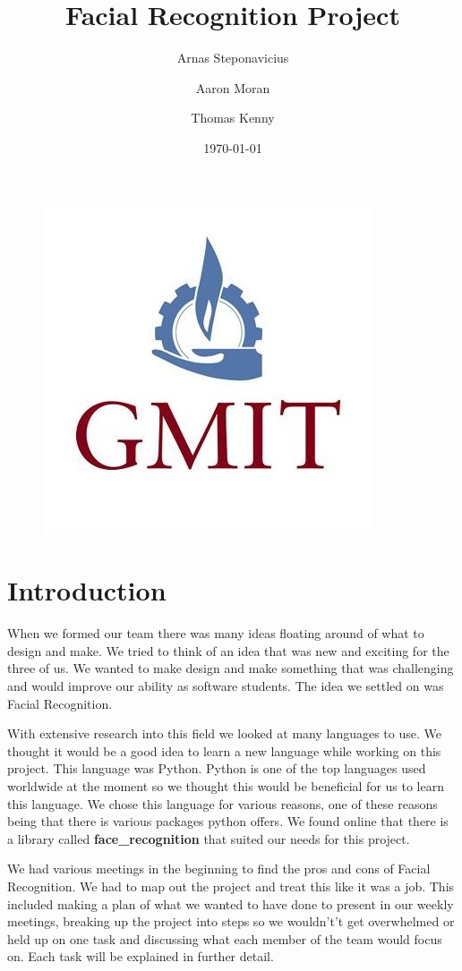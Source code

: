 \documentclass{article}
\begin{document}
\title{Facial Recognition Project}
\begin{figure}
    \centering
    \includegraphics[scale = 0.5]{gmit}
    \label{fig:gmit}
\end{figure}
\author{Arnas Steponavicius
        \and Aaron Moran
        \and Thomas Kenny}
\date{\today}

\maketitle
\section{Introduction}
When we formed our team there was many ideas floating around of what to design and make. We tried to think of an idea that was new and exciting for the three of us. We wanted to make design and make something that was challenging and would improve our ability as software students. The idea we settled on was Facial Recognition. 
    
With extensive research into this field we looked at many languages to use. We thought it would be a good idea to learn a new language while working on this project. This language was Python. 
Python is one of the top languages used worldwide at the moment so we thought this would be beneficial for us to learn this language. We chose this language for various reasons, one of these reasons being that there is various packages python offers. We found online that there is a library called \textbf{face\_recognition} that suited our needs for this project. 

We had various meetings in the beginning to find the pros and cons of Facial Recognition. We had to map out the project and treat this like it was a job. This included making a plan of what we wanted to have done to present in our weekly meetings, breaking up the project into steps so we wouldn't’t get overwhelmed or held up on one task and discussing what each member of the team would focus on. Each task will be explained in further detail.
\end{document}
